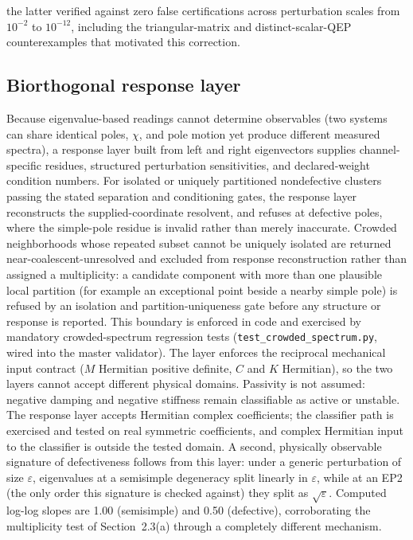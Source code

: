 the latter verified against zero false certifications across perturbation scales from \(10^{-2}\) to \(10^{-12}\), including the triangular-matrix and distinct-scalar-QEP counterexamples that motivated this correction.

\subsection{Biorthogonal response layer}

Because eigenvalue-based readings cannot determine observables (two systems can share identical poles, \(\chi\), and pole motion yet produce different measured spectra), a response layer built from left and right eigenvectors supplies channel-specific residues, structured perturbation sensitivities, and declared-weight condition numbers. For isolated or uniquely partitioned nondefective clusters passing the stated separation and conditioning gates, the response layer reconstructs the supplied-coordinate resolvent, and refuses at defective poles, where the simple-pole residue is invalid rather than merely inaccurate. Crowded neighborhoods whose repeated subset cannot be uniquely isolated are returned near-coalescent-unresolved and excluded from response reconstruction rather than assigned a multiplicity: a candidate component with more than one plausible local partition (for example an exceptional point beside a nearby simple pole) is refused by an isolation and partition-uniqueness gate before any structure or response is reported. This boundary is enforced in code and exercised by mandatory crowded-spectrum regression tests (\texttt{test\_crowded\_spectrum.py}, wired into the master validator). The layer enforces the reciprocal mechanical input contract (\(M\) Hermitian positive definite, \(C\) and \(K\) Hermitian), so the two layers cannot accept different physical domains. Passivity is not assumed: negative damping and negative stiffness remain classifiable as active or unstable. The response layer accepts Hermitian complex coefficients; the classifier path is exercised and tested on real symmetric coefficients, and complex Hermitian input to the classifier is outside the tested domain. A second, physically observable signature of defectiveness follows from this layer: under a generic perturbation of size \(\varepsilon\), eigenvalues at a semisimple degeneracy split linearly in \(\varepsilon\), while at an EP2 (the only order this signature is checked against) they split as \(\sqrt{\varepsilon}\). Computed log-log slopes are 1.00 (semisimple) and 0.50 (defective), corroborating the multiplicity test of Section~2.3(a) through a completely different mechanism.


